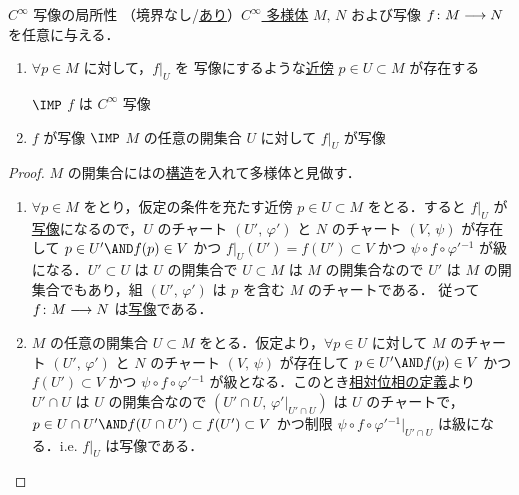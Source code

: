 \documentclass[geometry_main]{subfiles}
\begin{document}

\begin{mylem}[label=lem:cinfty_map-basic]{$C^\infty$ 写像の局所性}
	（境界なし/\hyperref[def:mani-with-boundary]{あり}）\hyperref[diffmani]{$C^\infty$ 多様体} $M,\, N$ および写像 $f \colon M \longrightarrow N$ を任意に与える．
	\begin{enumerate}
		\item $\forall p \in M$ に対して，$f|_U$ を \cinfty 写像にするような\hyperref[def.neighborhood]{近傍} $p \in U \subset M$ が存在する
		
		$\IMP$ $f$ は $C^\infty$ 写像
		\item $f$ が\cinfty 写像 $\IMP$ $M$ の任意の開集合 $U$ に対して $f|_U$ が\cinfty 写像
	\end{enumerate}
\end{mylem}

\begin{proof}
	$M$ の開集合にはの\hyperref[diffmani]{\cinfty 構造}を入れて\cinfty 多様体と見做す．
	\begin{enumerate}
		\item $\forall p \in M$ をとり，仮定の条件を充たす近傍 $p \in U \subset M$ をとる．すると $f|_U$ が\hyperref[def.cinfty_mapping]{\cinfty 写像}になるので，$U$ のチャート $(U',\, \varphi')$ と $N$ のチャート $(V,\, \psi)$ が存在して $p \in U' \AND f(p) \in V$ かつ $f|_U (U') = f(U') \subset V$ かつ $\psi \circ f  \circ \varphi'{}^{-1}$ が\cinfty 級になる．$U' \subset U$ は $U$ の開集合で $U \subset M$ は $M$ の開集合なので $U'$ は $M$ の開集合でもあり，組 $(U',\, \varphi')$ は $p$ を含む $M$ のチャートである．
		従って $f \colon M \longrightarrow N$ は\hyperref[def.cinfty_mapping]{\cinfty 写像}である．

		\item $M$ の任意の開集合 $U\subset M$ をとる．仮定より，$\forall p \in U$ に対して $M$ のチャート $(U',\, \varphi')$ と $N$ のチャート $(V,\, \psi)$ が存在して $p \in U' \AND f(p) \in V$ かつ $f(U') \subset V$ かつ $\psi \circ f \circ \varphi'{}^{-1}$ が\cinfty 級となる．このとき\hyperref[def.reltopo]{相対位相の定義}より $U' \cap U$ は $U$ の開集合なので $(U'\cap U,\, \varphi'|_{U'\cap U})$ は $U$ のチャートで，
		$p \in U\cap U' \AND f(U \cap U') \subset f(U') \subset V$ かつ制限 $\psi \circ f \circ \varphi'{}^{-1}|_{U'\cap U}$ は\cinfty 級になる．i.e. $f|_U$ は\cinfty 写像である．
	\end{enumerate}
\end{proof}
\end{document}
